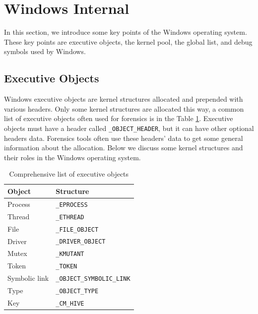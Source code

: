 \section[Windows Internal]{Windows Internal}

In this section, we introduce some key points of the Windows operating system.
These key points are executive objects, the kernel pool, the global list, and
debug symbols used by Windows.

\subsection[Executive Objects]{Executive Objects}

Windows executive objects are kernel structures allocated and prepended with
various headers. Only some kernel structures are allocated this way, a common
list of executive objects often used for forensics is in the Table
\ref{tab:execobj}. Executive objects must have a header called
\texttt{\_OBJECT\_HEADER}, but it can have other optional headers data.
Forensics tools often use these headers' data to get some general information
about the allocation. Below we discuss some kernel structures and their roles
in the Windows operating system.

\begin{table}[t]
\centering
\begin{tabular}{ll}
\hline
  Object        & Structure                         \\ \hline
  Process       & \texttt{\_EPROCESS}               \\
  Thread        & \texttt{\_ETHREAD}                \\
  File          & \texttt{\_FILE\_OBJECT}           \\
  Driver        & \texttt{\_DRIVER\_OBJECT}         \\
  Mutex         & \texttt{\_KMUTANT}                \\
  Token         & \texttt{\_TOKEN}                  \\
  Symbolic link & \texttt{\_OBJECT\_SYMBOLIC\_LINK} \\
  Type          & \texttt{\_OBJECT\_TYPE}           \\
  Key           & \texttt{\_CM\_HIVE}               \\
\end{tabular}
\caption{Comprehensive list of executive objects}
\label{tab:execobj}
\end{table}

